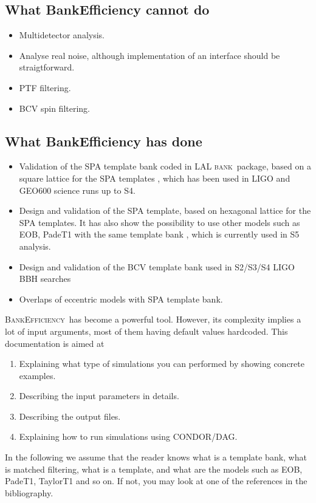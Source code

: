 \documentclass[a4paper,10pt]{article}
\newcommand{\bank}{\textsc{bank}~}
\newcommand{\be}{\textsc{BankEfficiency}~}
\begin{document}
\subsection*{What BankEfficiency cannot do }
\begin{itemize}
 \item Multidetector analysis.
 \item Analyse real noise, although implementation of an interface should be straigtforward.
 \item PTF filtering.
 \item BCV spin filtering.
\end{itemize}

\subsection*{What BankEfficiency has done}
\begin{itemize}
 \item Validation of the SPA template bank coded in LAL \bank package, based on a square lattice for the SPA templates \cite{squarebank}, which has been used in LIGO and GEO600 science runs up to S4.
 \item Design and validation of the SPA template, based on hexagonal lattice for the SPA templates. It has also show the possibility to use other models such as EOB, PadeT1 with the same template bank \cite{hexabank}, which is currently used in S5 analysis.
\item Design and validation of the BCV template bank used in S2/S3/S4 LIGO BBH searches \cite{bcvbank}
\item Overlaps of eccentric models with SPA template bank.
\end{itemize}


\be has become a powerful tool. However, its complexity implies a lot of input arguments, most of them having default values hardcoded. This documentation is aimed at
\begin{enumerate}
 \item Explaining what type of simulations you can performed by showing concrete examples.
 \item Describing the input parameters in details.
 \item Describing the output files.
 \item Explaining how to run simulations using CONDOR/DAG.
\end{enumerate}

In the following we assume that the reader knows what is a template bank, what is matched filtering, what is a template, and what are the models such as EOB, PadeT1, TaylorT1 and so on. If not, you may look at one of the references in the bibliography.
\end{document}
